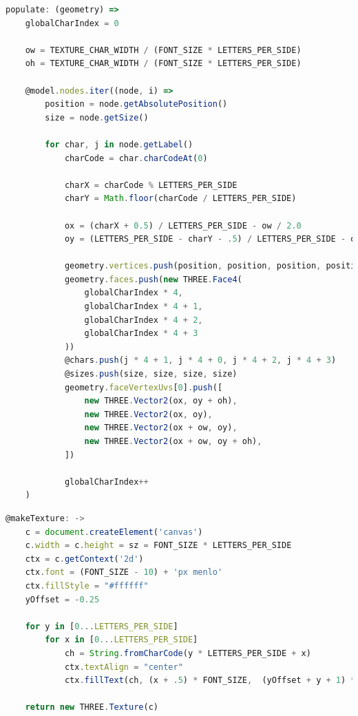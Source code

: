\minipage{\linewidth}
\begin{lstlisting}[caption={Initial creation of the labels in-memory representation.},label=lst:labels-cpu,language=javascript]
populate: (geometry) =>
    globalCharIndex = 0

    ow = TEXTURE_CHAR_WIDTH / (FONT_SIZE * LETTERS_PER_SIDE)
    oh = TEXTURE_CHAR_WIDTH / (FONT_SIZE * LETTERS_PER_SIDE)

    @model.nodes.iter((node, i) =>
        position = node.getAbsolutePosition()
        size = node.getSize()

        for char, j in node.getLabel()
            charCode = char.charCodeAt(0)

            charX = charCode % LETTERS_PER_SIDE
            charY = Math.floor(charCode / LETTERS_PER_SIDE)

            ox = (charX + 0.5) / LETTERS_PER_SIDE - ow / 2.0
            oy = (LETTERS_PER_SIDE - charY - .5) / LETTERS_PER_SIDE - oh / 2.0

            geometry.vertices.push(position, position, position, position)
            geometry.faces.push(new THREE.Face4(
                globalCharIndex * 4,
                globalCharIndex * 4 + 1,
                globalCharIndex * 4 + 2,
                globalCharIndex * 4 + 3
            ))
            @chars.push(j * 4 + 1, j * 4 + 0, j * 4 + 2, j * 4 + 3)
            @sizes.push(size, size, size, size)
            geometry.faceVertexUvs[0].push([
                new THREE.Vector2(ox, oy + oh),
                new THREE.Vector2(ox, oy),
                new THREE.Vector2(ox + ow, oy),
                new THREE.Vector2(ox + ow, oy + oh),
            ])

            globalCharIndex++
    )
\end{lstlisting}
\endminipage

\begin{lstlisting}[caption={Dynamic creation of the texture.},label=lst:labels-texture,language=javascript]
@makeTexture: ->
    c = document.createElement('canvas')
    c.width = c.height = sz = FONT_SIZE * LETTERS_PER_SIDE
    ctx = c.getContext('2d')
    ctx.font = (FONT_SIZE - 10) + 'px menlo'
    ctx.fillStyle = "#ffffff"
    yOffset = -0.25

    for y in [0...LETTERS_PER_SIDE]
        for x in [0...LETTERS_PER_SIDE]
            ch = String.fromCharCode(y * LETTERS_PER_SIDE + x)
            ctx.textAlign = "center"
            ctx.fillText(ch, (x + .5) * FONT_SIZE,  (yOffset + y + 1) * FONT_SIZE)

    return new THREE.Texture(c)
\end{lstlisting}

